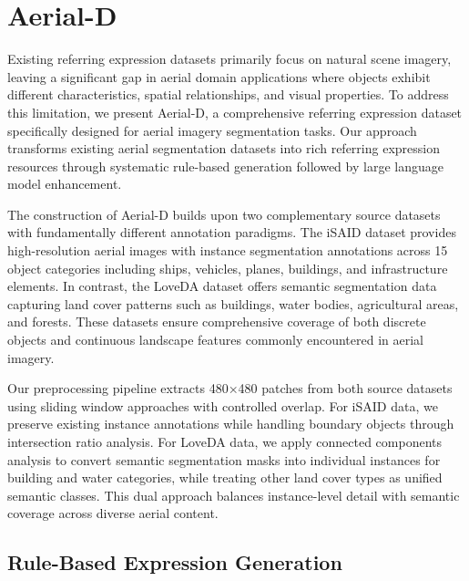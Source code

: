 
\section{Aerial-D}
\label{sec:approach}

Existing referring expression datasets primarily focus on natural scene imagery, leaving a significant gap in aerial domain applications where objects exhibit different characteristics, spatial relationships, and visual properties. To address this limitation, we present Aerial-D, a comprehensive referring expression dataset specifically designed for aerial imagery segmentation tasks. Our approach transforms existing aerial segmentation datasets into rich referring expression resources through systematic rule-based generation followed by large language model enhancement.

The construction of Aerial-D builds upon two complementary source datasets with fundamentally different annotation paradigms. The iSAID dataset provides high-resolution aerial images with instance segmentation annotations across 15 object categories including ships, vehicles, planes, buildings, and infrastructure elements. In contrast, the LoveDA dataset offers semantic segmentation data capturing land cover patterns such as buildings, water bodies, agricultural areas, and forests. These datasets ensure comprehensive coverage of both discrete objects and continuous landscape features commonly encountered in aerial imagery.

Our preprocessing pipeline extracts 480×480 patches from both source datasets using sliding window approaches with controlled overlap. For iSAID data, we preserve existing instance annotations while handling boundary objects through intersection ratio analysis. For LoveDA data, we apply connected components analysis to convert semantic segmentation masks into individual instances for building and water categories, while treating other land cover types as unified semantic classes. This dual approach balances instance-level detail with semantic coverage across diverse aerial content.

\subsection{Rule-Based Expression Generation}


